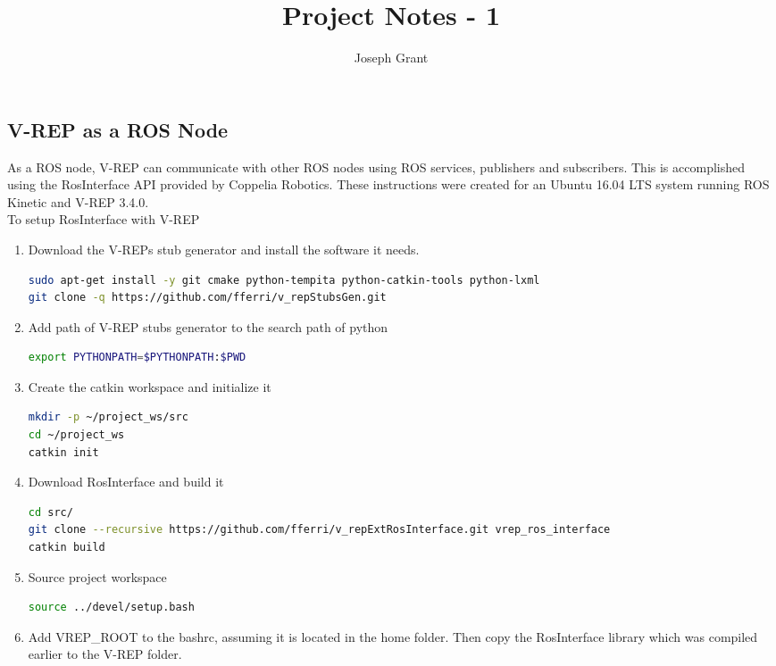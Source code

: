 \documentclass{article}
\begin{document}
\title{Project Notes - 1}
\author{Joseph Grant}
\maketitle


\begin{multicols*}{2}

\section{V-REP as a ROS Node}
\indent \indent As a ROS node, V-REP can communicate with other ROS nodes using ROS services, publishers and subscribers. This is accomplished using the RosInterface API provided by Coppelia Robotics. These instructions were created for an Ubuntu 16.04 LTS system running ROS Kinetic and V-REP 3.4.0. 
\\
\indent To setup RosInterface with V-REP 
\begin{enumerate}
\item Download the V-REPs stub generator and install the software it needs. 
\begin{lstlisting}[language=bash,breaklines=true]
sudo apt-get install -y git cmake python-tempita python-catkin-tools python-lxml 
git clone -q https://github.com/fferri/v_repStubsGen.git
\end{lstlisting}
\item Add path of V-REP stubs generator to the search path of python 
\begin{lstlisting}[language=bash,breaklines=true]
export PYTHONPATH=$PYTHONPATH:$PWD
\end{lstlisting}
\item Create the catkin workspace and initialize it 
\begin{lstlisting}[language=bash,breaklines=true]
mkdir -p ~/project_ws/src
cd ~/project_ws
catkin init
\end{lstlisting}
\item Download RosInterface and build it 
\begin{lstlisting}[language=bash,breaklines=true]
cd src/
git clone --recursive https://github.com/fferri/v_repExtRosInterface.git vrep_ros_interface
catkin build
\end{lstlisting}
\item Source project workspace
\begin{lstlisting}[language=bash,breaklines=true]
source ../devel/setup.bash
\end{lstlisting}
\item Add VREP\_ROOT to the bashrc, assuming it is located in the home folder. Then copy the RosInterface library which was compiled earlier to the V-REP folder.

\end{enumerate}
\end{multicols*}
\end{document}
